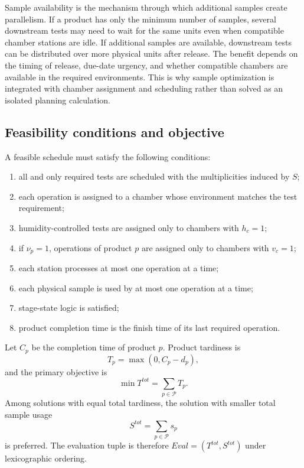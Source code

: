 \documentclass[11pt]{article}
\begin{document}
Sample availability is the mechanism through which additional samples create parallelism. If a product has only the minimum number of samples, several downstream tests may need to wait for the same units even when compatible chamber stations are idle. If additional samples are available, downstream tests can be distributed over more physical units after release. The benefit depends on the timing of release, due-date urgency, and whether compatible chambers are available in the required environments. This is why sample optimization is integrated with chamber assignment and scheduling rather than solved as an isolated planning calculation.

\subsection{Feasibility conditions and objective}
\label{subsec:objective}

A feasible schedule must satisfy the following conditions:
\begin{enumerate}
    \item all and only required tests are scheduled with the multiplicities induced by \(S\);
    \item each operation is assigned to a chamber whose environment matches the test requirement;
    \item humidity-controlled tests are assigned only to chambers with \(h_c=1\);
    \item if \(\nu_p=1\), operations of product \(p\) are assigned only to chambers with \(v_c=1\);
    \item each station processes at most one operation at a time;
    \item each physical sample is used by at most one operation at a time;
    \item stage-state logic is satisfied;
    \item product completion time is the finish time of its last required operation.
\end{enumerate}

Let \(C_p\) be the completion time of product \(p\). Product tardiness is
\[
T_p=\max(0,C_p-d_p),
\]
and the primary objective is
\[
\min T^{tot}=\sum_{p\in\mathcal{P}}T_p.
\]
Among solutions with equal total tardiness, the solution with smaller total sample usage
\[
S^{tot}=\sum_{p\in\mathcal{P}}s_p
\]
is preferred. The evaluation tuple is therefore \(Eval=(T^{tot},S^{tot})\) under lexicographic ordering.
\end{document}
